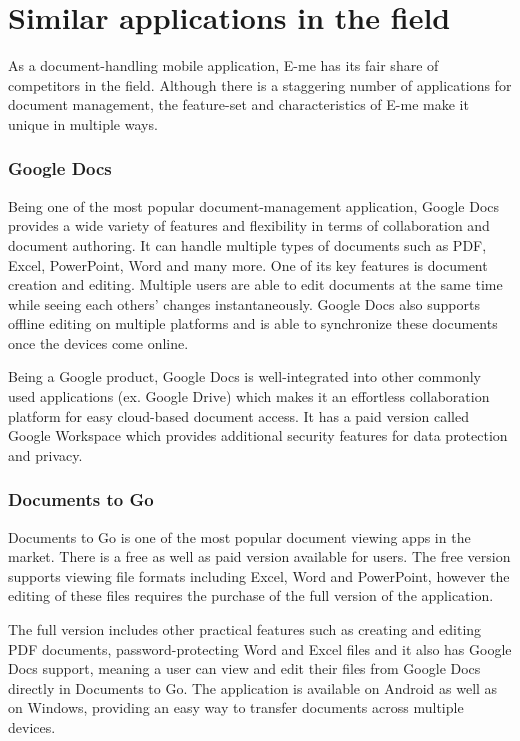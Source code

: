 \section{Similar applications in the field}\label{sec:INTRO:sa}

As a document-handling mobile application, E-me has its fair share of competitors in the field.
Although there is a staggering number of applications for document management, the feature-set and characteristics of E-me make it 
unique in multiple ways.

\subsubsection{Google Docs}

Being one of the most popular document-management application, Google Docs provides a wide variety of features and flexibility in terms of 
collaboration and document authoring.
It can handle multiple types of documents such as PDF, Excel, PowerPoint, Word and many more.
One of its key features is document creation and editing.
Multiple users are able to edit documents at the same time while seeing each others' changes instantaneously.
Google Docs also supports offline editing on multiple platforms and is able to synchronize these documents once the devices come online.

Being a Google product, Google Docs is well-integrated into other commonly used applications (ex. Google Drive) which makes 
it an effortless collaboration platform for easy cloud-based document access.
It has a paid version called Google Workspace which provides additional security features for data protection and privacy.

\subsubsection{Documents to Go}

Documents to Go is one of the most popular document viewing apps in the market.
There is a free as well as paid version available for users.
The free version supports viewing file formats including Excel, Word and PowerPoint, however the editing of these files requires the purchase
of the full version of the application.

The full version includes other practical features such as creating and editing PDF documents, password-protecting Word and Excel files
and it also has Google Docs support, meaning a user can view and edit their files from Google Docs directly in Documents to Go.
The application is available on Android as well as on Windows, providing an easy way to transfer documents across multiple devices.

